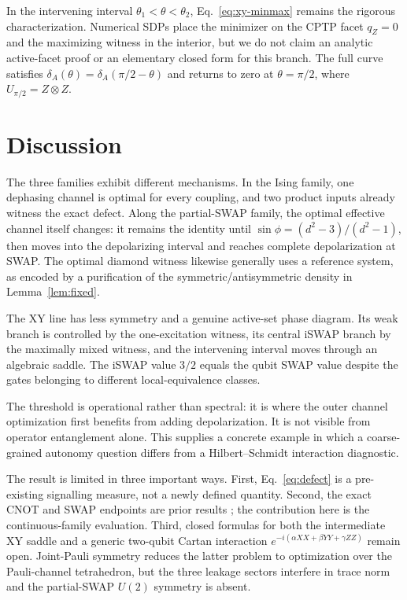 \documentclass[11pt,a4paper]{article}
\theoremstyle{remark}
\begin{document}
In the intervening interval $\theta_1<\theta<\theta_2$,
Eq.~\eqref{eq:xy-minmax} remains the rigorous characterization.  Numerical
SDPs place the minimizer on the CPTP facet $q_Z=0$ and the maximizing witness
in the interior, but we do not claim an analytic active-facet proof or an
elementary closed form for this branch.  The full curve satisfies
$\delta_A(\theta)=\delta_A(\pi/2-\theta)$ and returns to zero at
$\theta=\pi/2$, where $U_{\pi/2}=Z\otimes Z$.

\section{Discussion}

The three families exhibit different mechanisms.  In the Ising family, one
dephasing channel is optimal for every coupling, and two product inputs already
witness the exact defect.  Along the partial-SWAP family, the optimal effective
channel itself changes: it remains the identity until
$\sin\phi=(d^2-3)/(d^2-1)$, then moves into the depolarizing interval and
reaches complete depolarization at SWAP.  The optimal diamond witness likewise
generally uses a reference system, as encoded by a purification of the
symmetric/antisymmetric density in
Lemma~\ref{lem:fixed}.

The XY line has less symmetry and a genuine active-set phase diagram.  Its weak
branch is controlled by the one-excitation witness, its central iSWAP branch by
the maximally mixed witness, and the intervening interval moves through an
algebraic saddle.  The iSWAP value $3/2$ equals the qubit SWAP value despite the
gates belonging to different local-equivalence classes.

The threshold is operational rather than spectral: it is where the outer
channel optimization first benefits from adding depolarization.  It is not
visible from operator entanglement alone.  This supplies a concrete example in
which a coarse-grained autonomy question differs from a Hilbert--Schmidt
interaction diagnostic.

The result is limited in three important ways.  First, Eq.~\eqref{eq:defect}
is a pre-existing signalling measure, not a newly defined quantity.  Second,
the exact CNOT and SWAP endpoints are prior results
\cite{barsse2025}; the contribution here is the continuous-family evaluation.
Third, closed formulas for both the intermediate XY saddle and a generic
two-qubit Cartan interaction
$e^{-i(\alpha XX+\beta YY+\gamma ZZ)}$ remain open.  Joint-Pauli symmetry
reduces the latter problem to optimization over the Pauli-channel tetrahedron, but
the three leakage sectors interfere in trace norm and the partial-SWAP
$U(2)$ symmetry is absent.
\end{document}
